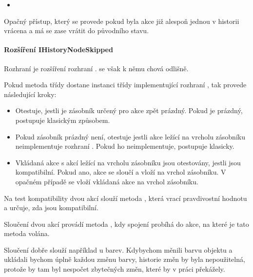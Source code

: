 \documentclass[
  field=inf,
  biblatex,
  glossaries,
  index
]{kidiplom}
\begin{document}
\begin{itemize}
\item {}
\end{itemize}
Opačný přístup, který se provede pokud byla akce již alespoň jednou v historii vrácena a má se zase vrátit do původního stavu.

\paragraph{Rozšíření IHistoryNodeSkipped}
Rozhraní  je rozšíření rozhraní .  se však k němu chová odlišně.

Pokud metoda  třídy  dostane instanci třídy implementující rozhraní , tak provede následující kroky:

\begin{itemize}
\item Otestuje, jestli je zásobník určený pro akce zpět prázdný. Pokud je prázdný, postupuje klasickým způsobem.
\item Pokud zásobník prázdný není, otestuje jestli akce ležící na vrcholu zásobníku neimplementuje rozhraní . Pokud ho neimplementuje, postupuje klasicky.
\item Vkládaná akce s akcí ležící na vrcholu zásobníku jsou otestovány, jestli jsou kompatibilní. Pokud ano, akce se sloučí a vloží na vrchol zásobníku. V opačném případě se vloží vkládaná akce na vrchol zásobníku.
\end{itemize}

Na test kompatibility dvou akcí  slouží metoda , která vrací pravdivostní hodnotu a určuje, zda jsou kompatibilní.

Sloučení dvou akcí provádí metoda , kdy spojení probíhá do akce, na které je tato metoda volána.

Sloučení dobře slouží například u barev. Kdybychom měnili barvu objektu a ukládali bychom úplně každou změnu barvy, historie změn by byla nepoužitelná, protože by tam byl nespočet zbytečných změn, které by v práci překážely.
\end{document}
